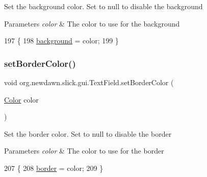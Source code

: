 Set the background color. Set to null to disable the background


\begin{DoxyParams}{Parameters}
{\em color} & The color to use for the background \\
\hline
\end{DoxyParams}

\begin{DoxyCode}
197                                                 \{
198         \mbox{\hyperlink{classorg_1_1newdawn_1_1slick_1_1gui_1_1_text_field_aea206c1ce4a086e7ade6b92a9bca9342}{background}} = color;
199     \}
\end{DoxyCode}
\mbox{\label{classorg_1_1newdawn_1_1slick_1_1gui_1_1_text_field_a9d31f9fb3f17624289cb95289592518a}} 
\subsubsection{\texorpdfstring{set\+Border\+Color()}{setBorderColor()}}
{\footnotesize\ttfamily void org.\+newdawn.\+slick.\+gui.\+Text\+Field.\+set\+Border\+Color (\begin{DoxyParamCaption}\item[{\mbox{\hyperlink{classorg_1_1newdawn_1_1slick_1_1_color}{Color}}}]{color }\end{DoxyParamCaption})\hspace{0.3cm}{\ttfamily [inline]}}

Set the border color. Set to null to disable the border


\begin{DoxyParams}{Parameters}
{\em color} & The color to use for the border \\
\hline
\end{DoxyParams}

\begin{DoxyCode}
207                                             \{
208         \mbox{\hyperlink{classorg_1_1newdawn_1_1slick_1_1gui_1_1_text_field_a6a2e66c20955c3523577a527524b6227}{border}} = color;
209     \}
\end{DoxyCode}
\mbox{\label{classorg_1_1newdawn_1_1slick_1_1gui_1_1_text_field_a45f3671e4e31e60557559b74918b3bef}} 
